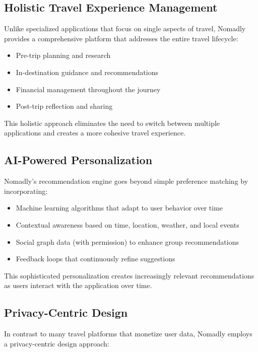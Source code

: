 \documentclass[11pt, a4paper]{article}
\begin{document}
\subsection{Holistic Travel Experience Management}

Unlike specialized applications that focus on single aspects of travel, Nomadly provides a comprehensive platform that addresses the entire travel lifecycle:

\begin{itemize}
    \item Pre-trip planning and research
    \item In-destination guidance and recommendations
    \item Financial management throughout the journey
    \item Post-trip reflection and sharing
\end{itemize}

This holistic approach eliminates the need to switch between multiple applications and creates a more cohesive travel experience.

\subsection{AI-Powered Personalization}

Nomadly's recommendation engine goes beyond simple preference matching by incorporating:

\begin{itemize}
    \item Machine learning algorithms that adapt to user behavior over time
    \item Contextual awareness based on time, location, weather, and local events
    \item Social graph data (with permission) to enhance group recommendations
    \item Feedback loops that continuously refine suggestions
\end{itemize}

This sophisticated personalization creates increasingly relevant recommendations as users interact with the application over time.

\subsection{Privacy-Centric Design}

In contrast to many travel platforms that monetize user data, Nomadly employs a privacy-centric design approach:
\end{document}
